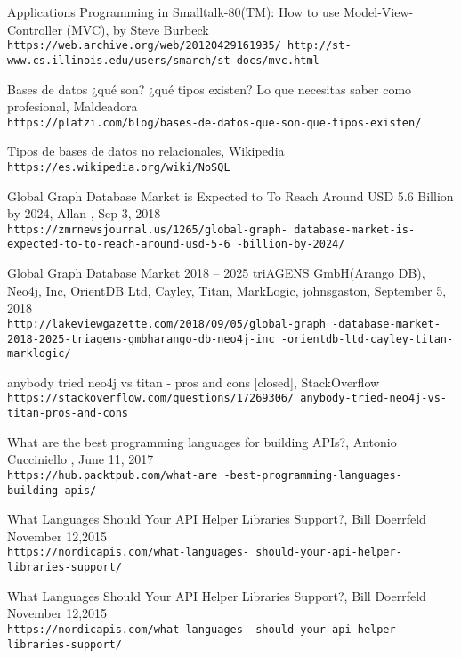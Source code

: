 \begin{thebibliography}{999}
Applications Programming in Smalltalk-80(TM):
How to use Model-View-Controller (MVC), by Steve Burbeck
\\\texttt{https://web.archive.org/web/20120429161935/
http://st-www.cs.illinois.edu/users/smarch/st-docs/mvc.html}


Bases de datos ¿qué son? ¿qué tipos existen? Lo que necesitas saber como profesional, Maldeadora
\\\texttt{https://platzi.com/blog/bases-de-datos-que-son-que-tipos-existen/}

Tipos de bases de datos no relacionales, Wikipedia
\\\texttt{https://es.wikipedia.org/wiki/NoSQL}

Global Graph Database Market is Expected to To Reach Around USD 5.6 Billion by 2024, Allan , Sep 3, 2018
\\\texttt{https://zmrnewsjournal.us/1265/global-graph-
database-market-is-expected-to-to-reach-around-usd-5-6
-billion-by-2024/}


Global Graph Database Market 2018 – 2025 triAGENS GmbH(Arango DB), Neo4j, Inc, OrientDB Ltd, Cayley, Titan, MarkLogic, johnsgaston, September 5, 2018 
\\\texttt{http://lakeviewgazette.com/2018/09/05/global-graph
-database-market-2018-2025-triagens-gmbharango-db-neo4j-inc
-orientdb-ltd-cayley-titan-marklogic/}

anybody tried neo4j vs titan - pros and cons [closed], StackOverflow
\\\texttt{https://stackoverflow.com/questions/17269306/
anybody-tried-neo4j-vs-titan-pros-and-cons}

What are the best programming languages for building APIs?, Antonio Cucciniello , June 11, 2017
\\\texttt{https://hub.packtpub.com/what-are
-best-programming-languages-building-apis/}

What Languages Should Your API Helper Libraries Support?,  Bill Doerrfeld November 12,2015
\\\texttt{https://nordicapis.com/what-languages-
should-your-api-helper-libraries-support/}

What Languages Should Your API Helper Libraries Support?,  Bill Doerrfeld November 12,2015
\\\texttt{https://nordicapis.com/what-languages-
should-your-api-helper-libraries-support/}


\end{thebibliography}

